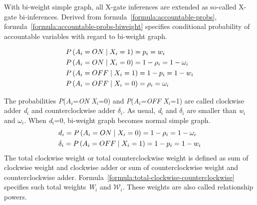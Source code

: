 \documentclass{article}
\numberwithin{equation}{section}
\numberwithin{figure}{section}
\numberwithin{table}{section}
\begin{document}
With bi-weight simple graph, all X-gate inferences are extended as so-called X-gate bi-inferences. Derived from formula~\ref{formula:accountable-probs}, formula~\ref{formula:accountable-probs-biweight} specifies conditional probability of accountable variables with regard to bi-weight graph.

\begin{equation}
\begin{split}
&P\left(A_i=ON\mathrel{\left|\vphantom{A_i=ON X_i=1}\right.\kern-\nulldelimiterspace}X_i=1\right)=p_i=w_i\\
&P\left(A_i=ON\mathrel{\left|\vphantom{A_i=ON X_i=0}\right.\kern-\nulldelimiterspace}X_i=0\right)=1-{\rho }_i=1-{\omega }_i\\
&P\left(A_i=OFF\mathrel{\left|\vphantom{A_i=OFF X_i=1}\right.\kern-\nulldelimiterspace}X_i=1\right)=1-p_i=1-w_i\\
&P\left(A_i=OFF\mathrel{\left|\vphantom{A_i=OFF X_i=0}\right.\kern-\nulldelimiterspace}X_i=0\right)={\rho }_i={\omega }_i\\
\end{split}
\label{formula:accountable-probs-biweight}
\end{equation}

The probabilities \textit{P}(\textit{A${}_{i}$}=\textit{ON} {\textbar} \textit{X${}_{i}$}=0) and \textit{P}(\textit{A${}_{i}$}=\textit{OFF} {\textbar} \textit{X${}_{i}$}=1) are called clockwise adder \textit{d${}_{i}$} and counterclockwise adder \textit{$\delta$${}_{i}$}. As usual, \textit{d${}_{i}$} and \textit{$\delta$${}_{i}$} are smaller than \textit{w${}_{i}$} and \textit{$\omega$${}_{i}$}. When \textit{d${}_{i}$}=0, bi-weight graph becomes normal simple graph.
\begin{align*}
&d_i=P\left(A_i=ON\mathrel{\left|\vphantom{A_i=ON X_i=0}\right.\kern-\nulldelimiterspace}X_i=0\right)=1-{\rho }_i=1-{\omega }_i\\
&{\delta }_i=P\left(A_i=OFF\mathrel{\left|\vphantom{A_i=OFF X_i=1}\right.\kern-\nulldelimiterspace}X_i=1\right)=1-p_i=1-w_i
\end{align*}
The total clockwise weight or total counterclockwise weight is defined as sum of clockwise weight and clockwise adder or sum of counterclockwise weight and counterclockwise adder. Formula~\ref{formula:total-clockwise-counterclockwise} specifies such total weights \textit{W${}_{i}$} and ${\mathcal{W}}_i$. These weights are also called relationship powers.
\end{document}
